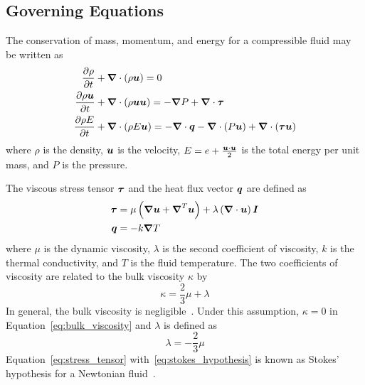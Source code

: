 \documentclass[compress,11pt]{beamer}
\begin{document}
\subsection{Governing Equations}
\frame
{
  The conservation of mass, momentum, and energy for a compressible fluid may be written as
  \begin{align}
    \label{eq:pde_comp_mass}
    {\frac{\partial{\rho}}{\partial{t}}} &+ {\boldsymbol{\nabla}} {}\cdot \left(\rho{\boldsymbol{u}}\right) = 0 \\
    \label{eq:pde_comp_mom}
    {\frac{\partial{\rho{\boldsymbol{u}}}}{\partial{t}}} &+ {\boldsymbol{\nabla}} {}\cdot\left(\rho{\boldsymbol{u}}{\boldsymbol{u}}\right) =
    -{\boldsymbol{\nabla}} {P} + {\boldsymbol{\nabla}} {}\cdot{\boldsymbol{\tau}} \\
    \label{eq:pde_comp_energy}
    {\frac{\partial{\rho E}}{\partial{t}}} &+ {\boldsymbol{\nabla}} {}\cdot\left(\rho E {\boldsymbol{u}}\right) =
    -{\boldsymbol{\nabla}} {}\cdot{\boldsymbol{q}} - {\boldsymbol{\nabla}} {}\cdot\left(P{\boldsymbol{u}}\right) + {\boldsymbol{\nabla}} {}\cdot\left({\boldsymbol{\tau}}{\boldsymbol{u}}\right)  
  \end{align}
  where $\rho$ is the density, ${\boldsymbol{u}}$ is the velocity, $E=e + \frac{{\boldsymbol{u}}\cdot{\boldsymbol{u}}}{2}$ is the total energy per unit mass, and $P$ is the pressure.
}

\frame
{
  \small
  The viscous stress tensor ${\boldsymbol{\tau}}$ and the heat flux vector ${\boldsymbol{q}}$ are defined as
  \begin{align}
    \label{eq:stress_tensor}
    {\boldsymbol{\tau}} &= \mu\left({\boldsymbol{\nabla}} {{\boldsymbol{u}}} + {\boldsymbol{\nabla}}^T {{\boldsymbol{u}}}\right) + \lambda \left({\boldsymbol{\nabla}} {}\cdot{\boldsymbol{u}}\right){\boldsymbol{I}} \\
    \label{eq:fouriers_law}
    {\boldsymbol{q}} &= -k{\boldsymbol{\nabla}} {T}
  \end{align}
  where $\mu$ is the dynamic viscosity, $\lambda$ is the second coefficient of viscosity, $k$ is the thermal conductivity, and $T$ is the fluid temperature.  The two coefficients of viscosity are related to the bulk viscosity $\kappa$ by
  \begin{equation}
    \label{eq:bulk_viscosity}
    \kappa = \frac{2}{3} \mu + \lambda
  \end{equation}
  In general, the bulk viscosity is negligible~\cite{cfmht}. Under this assumption, $\kappa=0$ in Equation~\eqref{eq:bulk_viscosity} and $\lambda$ is defined as
  \begin{equation}
    \label{eq:stokes_hypothesis}
    \lambda = -\frac{2}{3} \mu
  \end{equation}
  Equation~\eqref{eq:stress_tensor} with~\eqref{eq:stokes_hypothesis} is known as Stokes' hypothesis for a Newtonian fluid~\cite{panton_incompressible_flow}.
  \normalsize
}
\end{document}
